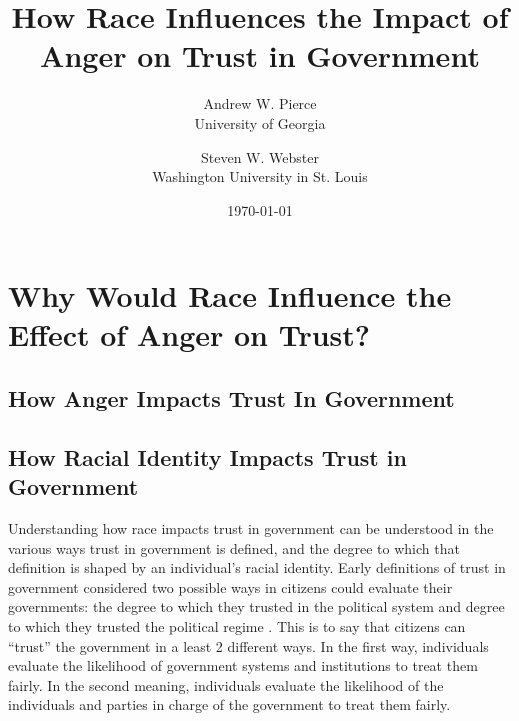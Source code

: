 \documentclass[12pt, letterpaper]{article}
\author{Andrew W. Pierce \\ University of Georgia \and Steven W. Webster \\ Washington University in St. Louis}
\title{How Race Influences the Impact of Anger on Trust in Government}
\date{\today}
\begin{document}
%

\begin{titlepage}
\maketitle

\thispagestyle{empty}

\begin{singlespacing}
\end{singlespacing}

\end{titlepage}


\newpage
\setcounter{page}{1}

\doublespacing

\section{Why Would Race Influence the Effect of Anger on Trust?}
\label{sec:litreview}

\subsection{How Anger Impacts Trust In Government}
\label{subsec:angertrust}

\subsection{How Racial Identity Impacts Trust in Government}
\label{subsec:racetrust}

Understanding how race impacts trust in government can be understood in the various ways trust in government is defined, and the degree to which that definition is shaped by an individual's racial identity. Early definitions of trust in government considered two possible ways in citizens could evaluate their governments: the degree to which they trusted in the political system and degree to which they trusted the political regime \citep{easton1965}. This is to say that citizens can ``trust'' the government in a least 2 different ways. In the first way, individuals evaluate the likelihood of government systems and institutions to treat them fairly. In the second meaning, individuals evaluate the likelihood of the individuals and parties in charge of the government to treat them fairly. 
\end{document}
